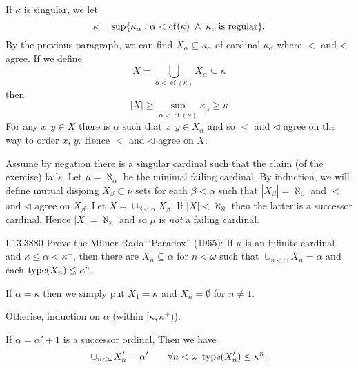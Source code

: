 If \(\kappa\) is singular,
we let
\begin{equation*}
\kappa = \sup \{\kappa_\alpha :
  \alpha<\operatorname{cf}(\kappa)
  \;\wedge\; \kappa_\alpha\,\textnormal{is regular}\}.
\end{equation*}
By the previous paragraph,
we can find \(X_\alpha \subseteq \kappa_\alpha\) of cardinal \(\kappa_\alpha\)
where $<$ and \(\triangleleft\) agree.
If we define
\begin{equation*}
X = \bigcup_{\alpha < \operatorname{cf}(\kappa)} X_\alpha \subseteq \kappa
\end{equation*}
then
\begin{equation*}
|X| \geq \sup_{\alpha < \operatorname{cf}(\kappa)} \kappa_\alpha \geq \kappa
\end{equation*}
For any \(x,y \in X\) there is \(\alpha\)
such that \(x,y \in X_\alpha\) and so $<$ and \(\triangleleft\) agree
on the way to order $x$, $y$. Hence $<$ and \(\triangleleft\) agree on $X$.

Assume by negation there is a singular cardinal such that
the claim (of the exercise) fails. Let \(\mu = \aleph_\alpha\) be the minimal
failing cardinal. 
By induction, we will define mutual disjoing
\(X_\beta\subset \nu\) sets for each \(\beta < \alpha\)
such that \(|X_\beta| = \aleph_\beta\)
and $<$ and \(\triangleleft\) agree on \(X_\beta\).
Let \(X = \cup_{\beta<\alpha} X_\beta\).
If \(|X| < \aleph_\aleph\) then the latter is a successor cardinal.
Hence \(|X| = \aleph_\aleph\) and so \(\mu\) is \emph{not} a failing cardinal.

\begin{lexcopy}{I.13.38}{80}
Prove the Milner-Rado ``Paradox'' (1965): If \(\kappa\) is an 
infinite cardinal and \hbox{\(\kappa \leq \alpha < \kappa^+\)},
then there are \(X_n \subseteq \alpha\) for \(n < \omega\) such that
\(\cup_{n < \omega} X_n = \alpha\) and each \(\mathop{\mathrm{type}}(X_n) \leq \kappa^n\).
\end{lexcopy}

If \(\alpha = \kappa\) then we simply put \(X_1=\kappa\)
and \(X_n=\emptyset\) for \(n\neq 1\).

Otherise, induction on \(\alpha\) (within \([\kappa, \kappa^+)\)).

If \(\alpha = \alpha' + 1\) is a successor ordinal,
Then we have
\begin{equation*}
\cup_{n < \omega} X'_n = \alpha' \qquad
\forall n<\omega\; \mathop{\mathrm{type}}(X'_n) \leq \kappa^n.
\end{equation*}

